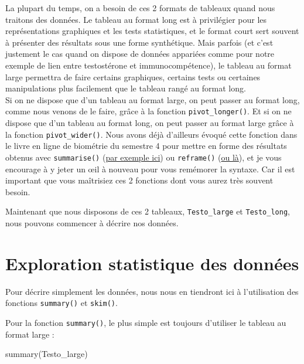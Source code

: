 \documentclass[
  a4paper,
  DIV=11,
  numbers=noendperiod,
  oneside]{scrreprt}
\newenvironment{Shaded}{}{}
\newcommand{\FunctionTok}[1]{\textcolor[rgb]{0.44,0.26,0.76}{#1}}
\newcommand{\NormalTok}[1]{\textcolor[rgb]{0.14,0.16,0.18}{#1}}
\begin{document}
La plupart du temps, on a besoin de ces 2 formats de tableaux quand nous
traitons des données. Le tableau au format long est à privilégier pour
les représentations graphiques et les tests statistiques, et le format
court sert souvent à présenter des résultats sous une forme synthétique.
Mais parfois (et c'est justement le cas quand on dispose de données
appariées comme pour notre exemple de lien entre testostérone et
immunocompétence), le tableau au format large permettra de faire
certains graphiques, certains tests ou certaines manipulations plus
facilement que le tableau rangé au format long.\\
Si on ne dispose que d'un tableau au format large, on peut passer au
format long, comme nous venons de le faire, grâce à la fonction
\texttt{pivot\_longer()}. Et si on ne dispose que d'un tableau au format
long, on peut passer au format large grâce à la fonction
\texttt{pivot\_wider()}. Nous avons déjà d'ailleurs évoqué cette
fonction dans le livre en ligne de biométrie du semestre 4 pour mettre
en forme des résultats obtenus avec \texttt{summarise()}
(\href{https://besibo.github.io/BiometrieS4/01-dispersion.html\#grouper-par-plus-dune-variable}{par
exemple ici}) ou \texttt{reframe()}
(\href{https://besibo.github.io/BiometrieS4/01-dispersion.html\#créer-des-résumés-avec-la-fonction-reframe}{ou
là}), et je vous encourage à y jeter un œil à nouveau pour vous
remémorer la syntaxe. Car il est important que vous maîtrisiez ces 2
fonctions dont vous aurez très souvent besoin.

Maintenant que nous disposons de ces 2 tableaux, \texttt{Testo\_large}
et \texttt{Testo\_long}, nous pouvons commencer à décrire nos données.

\hypertarget{exploration-statistique-des-donnuxe9es}{%
\section{Exploration statistique des
données}\label{exploration-statistique-des-donnuxe9es}}

Pour décrire simplement les données, nous nous en tiendront ici à
l'utilisation des fonctions \texttt{summary()} et \texttt{skim()}.

Pour la fonction \texttt{summary()}, le plus simple est toujours
d'utiliser le tableau au format large :

\begin{Shaded}
\begin{Highlighting}[]
\FunctionTok{summary}\NormalTok{(Testo\_large)}
\end{Highlighting}
\end{Shaded}
\end{document}
